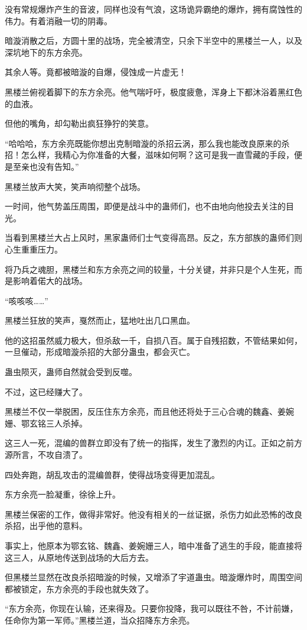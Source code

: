 \begin{this_body}
没有常规爆炸产生的音波，同样也没有气浪，这场诡异霸绝的爆炸，拥有腐蚀性的伟力。有着消融一切的阴毒。

暗漩消散之后，方圆十里的战场，完全被清空，只余下半空中的黑楼兰一人，以及深坑地下的东方余亮。

其余人等。竟都被暗漩的自爆，侵蚀成一片虚无！

黑楼兰俯视着脚下的东方余亮。他气喘吁吁，极度疲惫，浑身上下都沐浴着黑红色的血液。

但他的嘴角，却勾勒出疯狂狰狞的笑意。

“哈哈哈，东方余亮既能你想出克制暗漩的杀招云涡，那么我也能改良原来的杀招！怎么样，我精心为你准备的大餐，滋味如何啊？这可是我一直雪藏的手段，便是至亲也没有告知。”

黑楼兰放声大笑，笑声响彻整个战场。

一时间，他气势盖压周围，即便是战斗中的蛊师们，也不由地向他投去关注的目光。

当看到黑楼兰大占上风时，黑家蛊师们士气变得高昂。反之，东方部族的蛊师们则心生重重压力。

将乃兵之魂胆，黑楼兰和东方余亮之间的较量，十分关键，并非只是个人生死，而是影响着偌大的战场。

“咳咳咳……”

黑楼兰狂放的笑声，戛然而止，猛地吐出几口黑血。

他的这招虽然威力极大，但杀敌一千，自损八百。属于自残招数，不管结果如何，一旦催动，形成暗漩杀招的大部分蛊虫，都会灭亡。

蛊虫陨灭，蛊师自然就会受到反噬。

不过，这已经赚大了。

黑楼兰不仅一举脱困，反压住东方余亮，而且他还将处于三心合魂的魏鑫、姜婉姗、鄂玄铭三人杀掉。

这三人一死，混编的兽群立即没有了统一的指挥，发生了激烈的内讧。正如之前方源所言，不攻自溃了。

四处奔跑，胡乱攻击的混编兽群，使得战场变得更加混乱。

东方余亮一脸凝重，徐徐上升。

黑楼兰保密的工作，做得非常好。他没有相关的一丝证据，杀伤力如此恐怖的改良杀招，出乎他的意料。

事实上，他原本为鄂玄铭、魏鑫、姜婉姗三人，暗中准备了逃生的手段，能直接将这三人，从原地传送到战场的大后方去。

但黑楼兰显然在改良杀招暗漩的时候，又增添了宇道蛊虫。暗漩爆炸时，周围空间都被锁定，东方余亮的手段也就失效了。

“东方余亮，你现在认输，还来得及。只要你投降，我可以既往不咎，不计前嫌，任命你为第一军师。”黑楼兰道，当众招降东方余亮。


\end{this_body}
